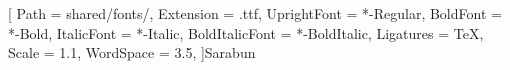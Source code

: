 
\RequirePackage{iftex}
\RequireLuaTeX

\ifdefined\csromanuseprintinggeometry
  \def\csromanprintingscalenum{937308}%
  \def\csromanprintingscaleden{1000000}%
  \def\csromanprintingscale{0.937308}%
  
\else
  \def\csromanprintingscalenum{1}%
  \def\csromanprintingscaleden{1}%
  \def\csromanprintingscale{1}%
  \ifdefined\csromanusereadinggeometry
    
  \else
    
  \fi
\fi

\usepackage[
  main=thai,
  english,
  provide=*,
]{babel}


\ifdefined\csromanuseprintinggeometry
  \def\csromanfontscale{1.031038}%
\else
  \def\csromanfontscale{1.1}%
\fi

[
  Path           = shared/fonts/,
  Extension      = .ttf,
  UprightFont    = *-Regular,
  BoldFont       = *-Bold,
  ItalicFont     = *-Italic,
  BoldItalicFont = *-BoldItalic,
  Ligatures      = TeX,
  Scale          = \csromanfontscale,
  WordSpace      = 3.5,
]{Sarabun}

